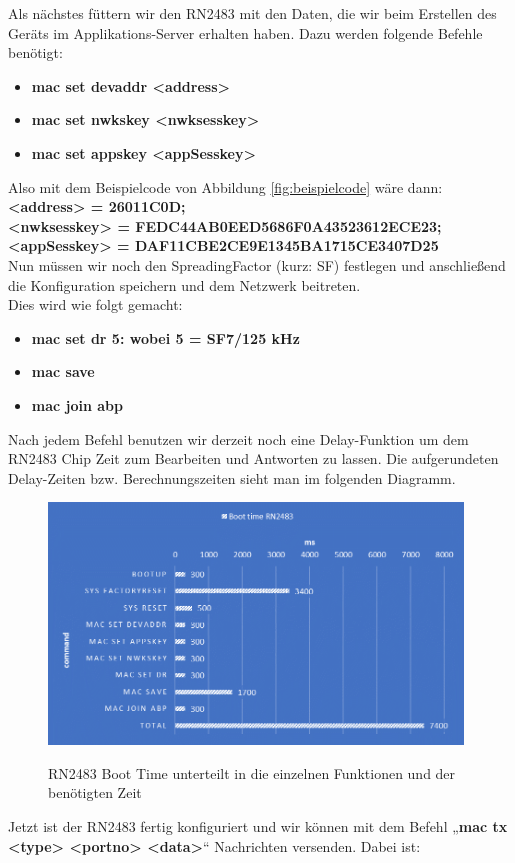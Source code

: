 Als nächstes füttern wir den RN2483 mit den Daten, die wir beim Erstellen des Geräts im Applikations-Server erhalten haben. Dazu werden folgende Befehle benötigt:
\begin{itemize}
    \item \textbf{mac set devaddr <address>}
    \item \textbf{mac set nwkskey <nwksesskey>}
    \item \textbf{mac set appskey <appSesskey>}
\end{itemize}
Also mit dem Beispielcode von Abbildung \ref{fig:beispielcode} wäre dann:\\
\textbf{<address> = 26011C0D;}\\
\textbf{<nwksesskey> = FEDC44AB0EED5686F0A43523612ECE23;}\\
\textbf{<appSesskey> = DAF11CBE2CE9E1345BA1715CE3407D25}\\

Nun müssen wir noch den SpreadingFactor (kurz: SF) festlegen und anschließend die Konfiguration speichern und dem Netzwerk beitreten.\\
Dies wird wie folgt gemacht: 

\begin{itemize}
    \item \textbf{mac set dr 5: wobei 5 = SF7/125 kHz}
    \item \textbf{mac save}
    \item \textbf{mac join abp}
\end{itemize}

Nach jedem Befehl benutzen wir derzeit noch eine Delay-Funktion um dem RN2483 Chip Zeit zum Bearbeiten und Antworten zu lassen. Die aufgerundeten Delay-Zeiten bzw. Berechnungszeiten sieht man im folgenden Diagramm.

\begin{figure}[ht]
    \center
    \includegraphics[width=11cm]{Bilder/lora-9.png}\\
    \caption{RN2483 Boot Time unterteilt in die einzelnen Funktionen und der benötigten Zeit}
    \label{fig:boot-time}
\end{figure}
Jetzt ist der RN2483 fertig konfiguriert und wir können mit dem Befehl „\textbf{mac tx <type> <portno> <data>}“ Nachrichten versenden. Dabei ist:\\

